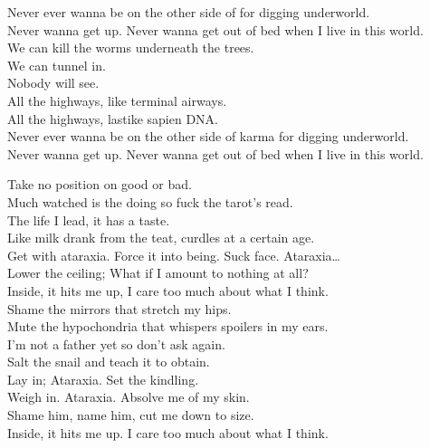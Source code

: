 Never ever wanna be on the other side of  for digging underworld. \\
Never wanna get up. Never wanna get out of bed when I live in this world. \\

We can kill the worms underneath the trees. \\
We can tunnel in. \\
Nobody will see. \\

All the highways, like terminal airways. \\
All the highways, lastike sapien DNA. \\

Never ever wanna be on the other side of karma for digging underworld. \\
Never wanna get up. Never wanna get out of bed when I live in this world. \\




Take no position on good or bad. \\
Much watched is the doing so fuck the tarot's read. \\
The life I lead, it has a taste. \\
Like milk drank from the teat, curdles at a certain age. \\

Get with ataraxia. Force it into being. Suck face. Ataraxia… \\
Lower the ceiling; What if I amount to nothing at all? \\
Inside, it hits me up, I care too much about what I think. \\

Shame the mirrors that stretch my hips. \\
Mute the hypochondria that whispers spoilers in my ears. \\
I'm not a father yet so don't ask again. \\
Salt the snail and teach it to obtain. \\

Lay in; Ataraxia. Set the kindling. \\
Weigh in. Ataraxia. Absolve me of my skin. \\
Shame him, name him, cut me down to size. \\
Inside, it hits me up. I care too much about what I think. \\

